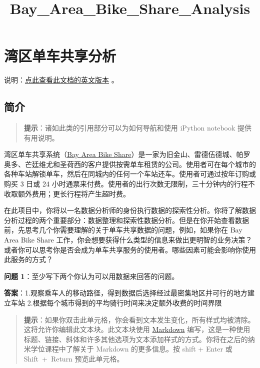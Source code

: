 \documentclass[11pt]{article}
\title{Bay\_Area\_Bike\_Share\_Analysis}
\begin{document}
    
    
    \maketitle
    
    

    
    \section{湾区单车共享分析}\label{ux6e7eux533aux5355ux8f66ux5171ux4eabux5206ux6790}

说明：\href{https://github.com/udacity/data-analyst/tree/master/projects/bike_sharing}{点此查看此文档的英文版本}
。

\subsection{简介}\label{ux7b80ux4ecb}

\begin{quote}
\textbf{提示}：诸如此类的引用部分可以为如何导航和使用 iPython notebook
提供有用说明。
\end{quote}

湾区单车共享系统（\href{http://www.bayareabikeshare.com/}{Bay Area Bike
Share}）是一家为旧金山、雷德伍德城、帕罗奥多、芒廷维尤和圣荷西的客户提供按需单车租赁的公司。使用者可在每个城市的各种车站解锁单车，然后在同城内的任何一个车站还车。使用者可通过按年订购或购买
3 日或 24
小时通票来付费。使用者的出行次数无限制，三十分钟内的行程不收取额外费用；更长行程将产生超时费。

在此项目中，你将以一名数据分析师的身份执行数据的探索性分析。你将了解数据分析过程的两个重要部分：数据整理和探索性数据分析。但是在你开始查看数据前，先思考几个你需要理解的关于单车共享数据的问题，例如，如果你在
Bay Area Bike Share
工作，你会想要获得什么类型的信息来做出更明智的业务决策？或者你可以思考你是否会成为单车共享服务的使用者。哪些因素可能会影响你使用此服务的方式？

\textbf{问题 1}：至少写下两个你认为可以用数据来回答的问题。

\textbf{答案}：1.观察乘车人的移动路径，得到数据后选择经过最密集地区并可行的地方建立车站
2.根据每个城市得到的平均骑行时间来决定额外收费的时间界限

\begin{quote}
\textbf{提示}：如果你双击此单元格，你会看到文本发生变化，所有样式均被清除。这将允许你编辑此文本块。此文本块使用
\href{http://daringfireball.net/projects/markdown/syntax}{Markdown}
编写，这是一种使用标题、链接、斜体和许多其他选项为文本添加样式的方式。你将在之后的纳米学位课程中了解关于
Markdown 的更多信息。按 shift + Enter 或 Shift~+~Return 预览此单元格。
\end{quote}
\end{document}

